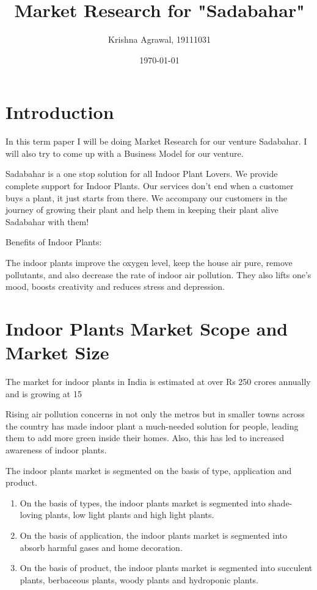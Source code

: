\documentclass{article}
\title{Market Research for "Sadabahar"}
\author{Krishna Agrawal, 19111031}
\date{\today}
\begin{document}
\maketitle


\section{Introduction}

In this term paper I will be doing Market Research for our venture Sadabahar. I will also try to come up with a Business Model for our venture.

Sadabahar is a one stop solution for all Indoor Plant Lovers. We provide complete support for Indoor Plants. Our services don't end when a customer buys a plant, it just starts from there. 
We accompany our customers in the journey of growing their plant and help them in keeping their plant alive Sadabahar with them! 
 
Benefits of Indoor Plants:

The indoor plants improve the oxygen level, keep the house air pure, remove pollutants, and also decrease the rate of indoor air pollution. They also lifts one’s mood, boosts creativity and reduces stress and depression.


\section{Indoor Plants Market Scope and Market Size}

The market for indoor plants in India is estimated at over Rs 250 crores annually and is growing at 15%

Rising air pollution concerns in not only the metros but in smaller towns across the country has made indoor plant a much-needed solution for people, leading them to add more green inside their homes. Also, this has led to increased awareness of indoor plants.

The indoor plants market is segmented on the basis of type, application and product. 

\begin{enumerate}

\item On the basis of types, the indoor plants market is segmented into shade- loving plants, low light plants and high light plants.
\item On the basis of application, the indoor plants market is segmented into absorb harmful gases and home decoration.
\item On the basis of product, the indoor plants market is segmented into succulent plants, berbaceous plants, woody plants and hydroponic plants.
\end{enumerate}
\end{document}

